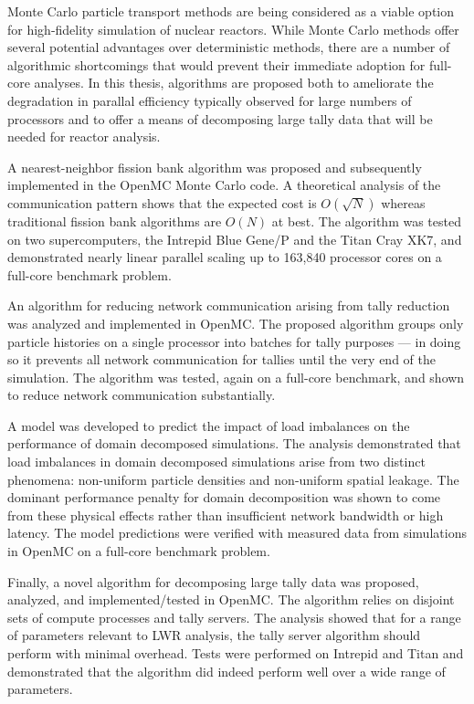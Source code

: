 \begin{abstractpage}
Monte Carlo particle transport methods are being considered as a viable option
for high-fidelity simulation of nuclear reactors. While Monte Carlo methods
offer several potential advantages over deterministic methods, there are a
number of algorithmic shortcomings that would prevent their immediate adoption
for full-core analyses. In this thesis, algorithms are proposed both to
ameliorate the degradation in parallal efficiency typically observed for large
numbers of processors and to offer a means of decomposing large tally data that
will be needed for reactor analysis.

A nearest-neighbor fission bank algorithm was proposed and subsequently
implemented in the OpenMC Monte Carlo code. A theoretical analysis of the
communication pattern shows that the expected cost is $O(\sqrt{N})$ whereas
traditional fission bank algorithms are $O(N)$ at best. The algorithm was tested
on two supercomputers, the Intrepid Blue Gene/P and the Titan Cray XK7, and
demonstrated nearly linear parallel scaling up to 163,840 processor cores on a
full-core benchmark problem.

An algorithm for reducing network communication arising from tally reduction was
analyzed and implemented in OpenMC. The proposed algorithm groups only particle
histories on a single processor into batches for tally purposes --- in doing so
it prevents all network communication for tallies until the very end of the
simulation. The algorithm was tested, again on a full-core benchmark, and shown
to reduce network communication substantially.

A model was developed to predict the impact of load imbalances on the
performance of domain decomposed simulations. The analysis demonstrated that
load imbalances in domain decomposed simulations arise from two distinct
phenomena: non-uniform particle densities and non-uniform spatial leakage. The
dominant performance penalty for domain decomposition was shown to come from
these physical effects rather than insufficient network bandwidth or high
latency. The model predictions were verified with measured data from simulations
in OpenMC on a full-core benchmark problem.

Finally, a novel algorithm for decomposing large tally data was proposed,
analyzed, and implemented/tested in OpenMC. The algorithm relies on disjoint
sets of compute processes and tally servers. The analysis showed that for a
range of parameters relevant to LWR analysis, the tally server algorithm should
perform with minimal overhead. Tests were performed on Intrepid and Titan and
demonstrated that the algorithm did indeed perform well over a wide range of
parameters.
\end{abstractpage}
